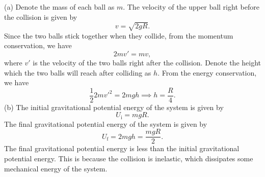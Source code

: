 \documentclass{article}
\begin{document}
\begin{solution}
  (a) Denote the mass of each ball as \( m \). The velocity of the upper ball right before the collision is given by
  \[ v=\sqrt{2gR}. \]
  Since the two balls stick together when they collide, from the momentum conservation, we have
  \[ 2mv' = mv, \]
  where \( v' \) is the velocity of the two balls right after the collision. Denote the height which the two balls will reach after colliding as \( h \). From the energy conservation, we have
  \[ \frac{1}{2}2mv'^2=2mgh\implies h=\frac{R}{4}. \]
  (b) The initial gravitational potential energy of the system is given by
  \[ U_\mathrm{i}=mgR. \]
  The final gravitational potential energy of the system is given by
  \[ U_\mathrm{f}=2mgh=\frac{mgR}{2}. \]
  The final gravitational potential energy is less than the initial gravitational potential energy. This is because the collision is inelastic, which dissipates some mechanical energy of the system.
\end{solution}
\end{document}
